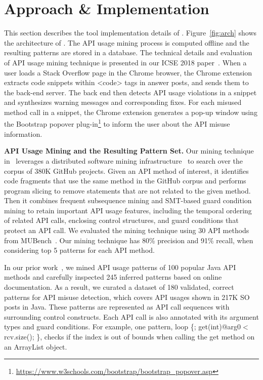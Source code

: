 \section{Approach \& Implementation}
\label{sec:implementation}

This section describes the tool implementation details of {\tool}. Figure~\ref{fig:arch} shows the architecture of {\tool}. 
The API usage mining process is computed offline and the resulting patterns are stored in a database. The technical details and evaluation of API usage mining technique is presented in our ICSE 2018 paper~\cite{zhang2018code}. When a user loads a Stack Overflow page in the Chrome browser, the Chrome extension extracts code snippets within {\ttt <code>} tags in answer posts, and sends them to the back-end server. The back end then detects API usage violations in a snippet and synthesizes warning messages and corresponding fixes. For each misused method call in a snippet, the Chrome extension generates a pop-up window using the Bootstrap popover plug-in\footnote{\url{https://www.w3schools.com/bootstrap/bootstrap_popover.asp}} to inform the user about the API misuse information.

{\bf API Usage Mining and the Resulting Pattern Set.} Our mining technique in~\cite{zhang2018code} leverages a distributed software mining infrastructure~\cite{dyer2013boa} to search over the corpus of 380K GitHub projects. Given an API method of interest, it identifies code fragments that use the same method in the GitHub corpus and performs program slicing to remove statements that are not related to the given method. Then it combines frequent subsequence mining and SMT-based guard condition mining to retain important API usage features, including the temporal
ordering of related API calls, enclosing control structures, and guard conditions that protect an API call. We evaluated the mining technique using 30 API methods from MUBench~\cite{amani2016mubench}. Our mining technique has 80\% precision and 91\% recall, when considering top 5 patterns for each API method.

In our prior work~\cite{zhang2018code}, we mined API usage patterns of 100 popular Java API methods and carefully inspected 245 inferred patterns based on online documentation. As a result, we curated a dataset of 180 validated, correct patterns for API misuse detection, which covers API usages shown in 217K SO posts in Java. These patterns are represented as API call sequences with surrounding control constructs. Each API call is also annotated with its argument types and guard conditions. For example, one pattern, {\ttt loop \{; get(int)@arg0$<$rcv.size(); \}}, checks if the index is out of bounds when calling the {\ttt get} method on an {\ttt ArrayList} object. %

